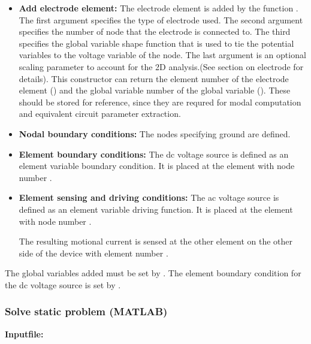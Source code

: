 \begin{itemize}
\begin{itemize}
     \item{\textbf{Add electrode element:}}
     The electrode element is added by the function
     . The first argument specifies the 
     type of electrode used. The second argument specifies the 
     number of node that the electrode is connected to. The
     third specifies the global variable shape function that
     is used to tie the potential variables to the voltage variable
     of the node. The last argument is an optional scaling parameter
     to account for the 2D analysis.(See section on electrode for
     details). This constructor can return the element number of 
     the electrode element () and the global 
     variable number of the global variable (). 
     These should be stored for reference, since they are requred
     for modal computation and equivalent circuit parameter 
     extraction. 

     \item{\textbf{Nodal boundary conditions:}}
     The nodes specifying ground are defined.

     \item{\textbf{Element boundary conditions:}}
     The dc voltage source is 
     defined as an element variable boundary condition.
     It is placed at the  element with node 
     number . 

     \item{\textbf{Element sensing and driving conditions:}}
     The ac voltage source is 
     defined as an element variable driving function.
     It is placed at the  element with node 
     number . 

     The resulting motional current is sensed at the other
      element on the other side of the device with
     element number .

  \end{itemize}
  
  The global variables added must be set by .
  The element boundary condition for the dc voltage source is 
  set by .

\end{itemize}

\clearpage
\subsubsection*{Solve static problem (MATLAB)}
\begin{flushleft}
  \textbf{Inputfile:}
  \\
\end{flushleft}
\hspace{1in}
{\footnotesize
{}
}

